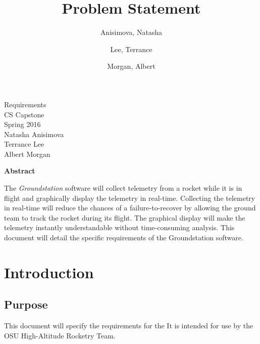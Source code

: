 \documentclass[10pt,journal,draftclsnofoot,onecolumn]{IEEEtran}
\begin{document}
	\singlespace
	
	\title{\vspace{2in}Problem Statement}
	
	\author {
		Anisimova, Natasha
		\and
		Lee, Terrance
		\and
		Morgan, Albert
	}
	
	
	\pagestyle{empty}
	\vspace*{2in}
	\begin{center}
		\huge
		Requirements\\
		\normalsize
		\vspace{5mm}
		CS Capstone\\
		Spring 2016\\
		\vspace{5mm}
		Natasha Anisimova\\
		Terrance Lee\\
		Albert Morgan
	\end{center}
	
	\vspace{5mm}
	
	\begin{center}
		\textbf{Abstract}
	\end{center}
	
	\begin{adjustwidth}{2in}{2in}
	
	The \textit{Groundstation} software will collect telemetry from a rocket while it is in flight and graphically display the telemetry in real-time.
	Collecting the telemetry in real-time will reduce the chances of a failure-to-recover by allowing the ground team to track the rocket during its flight.
	The graphical display will make the telemetry instantly understandable without time-consuming analysis.
	This document will detail the specific requirements of the Groundstation software.

	
	\end{adjustwidth}
	
	\newpage
	\pagestyle{headings}


	\section{Introduction}
	
	\subsection{Purpose}
	This document will specify the requirements for the 
	It is intended for use by the OSU High-Altitude Rocketry Team.
	
\end{document}
